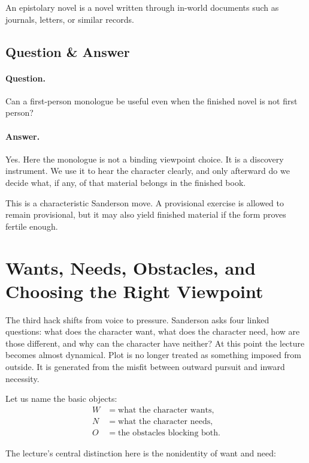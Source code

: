 \begin{definition}
An epistolary novel is a novel written through in-world documents such as journals, letters, or similar records.
\end{definition}

\subsection{Question \& Answer}

\paragraph{Question.} Can a first-person monologue be useful even when the finished novel is not first person?

\paragraph{Answer.} Yes. Here the monologue is not a binding viewpoint choice. It is a discovery instrument. We use it to hear the character clearly, and only afterward do we decide what, if any, of that material belongs in the finished book.

This is a characteristic Sanderson move. A provisional exercise is allowed to remain provisional, but it may also yield finished material if the form proves fertile enough.

\section{Wants, Needs, Obstacles, and Choosing the Right Viewpoint}

The third hack shifts from voice to pressure. Sanderson asks four linked questions: what does the character want, what does the character need, how are those different, and why can the character have neither? At this point the lecture becomes almost dynamical. Plot is no longer treated as something imposed from outside. It is generated from the misfit between outward pursuit and inward necessity.

Let us name the basic objects:
\begin{align}
W&=\text{what the character wants},\\
N&=\text{what the character needs},\\
O&=\text{the obstacles blocking both}.
\end{align}

The lecture's central distinction here is the nonidentity of want and need:

